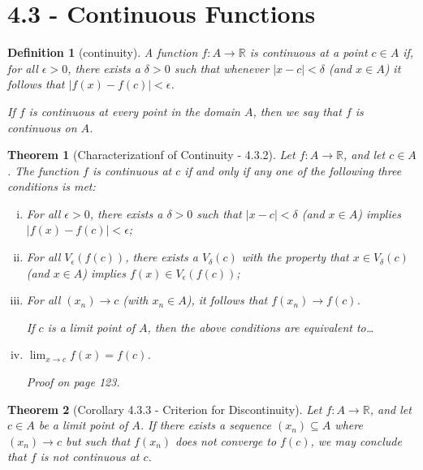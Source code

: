 \documentclass{article}
\newtheorem{definition}{Definition}
\newtheorem{theorem}{Theorem}
\begin{document}
\section*{4.3 - Continuous Functions}
\begin{definition}[continuity]
    A function $f:A\rightarrow \mathbb{R}$ is \textit{continuous} at a point $c\in A$ if, for all $\epsilon > 0$, there exists a $\delta > 0$ such that whenever $|x-c|<\delta$ (and $x \in A$) it follows that $|f(x)-f(c)| < \epsilon$.

    If $f$ is continuous at every point in the domain $A$, then we say that $f$ is \textit{continuous} on $A$.
\end{definition}

\begin{theorem}[Characterizationf of Continuity - 4.3.2]
    Let $f:A\rightarrow \mathbb{R}$, and let $c \in A$. The function $f$ is continuous at $c$ if and only if any one of the following three conditions is met:
    \begin{enumerate}[(i)]
        \item For all $\epsilon > 0$, there exists a $\delta > 0$ such that $|x - c| < \delta$ (and $x \in A$) implies $|f(x)-f(c)|<\epsilon$;
        \item For all $V_\epsilon (f(c))$, there exists a $V_\delta (c)$ with the property that $x \in V_\delta (c)$ (and $x \in A$) implies $f(x) \in V_\epsilon (f(c))$;
        \item For all $(x_n)\rightarrow c$ (with $x_n \in A$), it follows that $f(x_n) \rightarrow f(c)$.
        
        If $c$ is a limit point of $A$, then the above conditions are equivalent to\dots
        \item $\lim _{x \rightarrow c}f(x) = f(c)$.
        
        Proof on page 123.
    \end{enumerate}
\end{theorem}

\begin{theorem}[Corollary 4.3.3 - Criterion for Discontinuity]
    Let $f:A\rightarrow \mathbb{R}$, and let $c \in A$ be a limit point of $A$. If there exists a sequence $(x_n)\subseteq A$ where $(x_n)\rightarrow c$ but such that $f(x_n)$ does not converge to $f(c)$, we may conclude that $f$ is not continuous at $c$.
\end{theorem}
\end{document}
